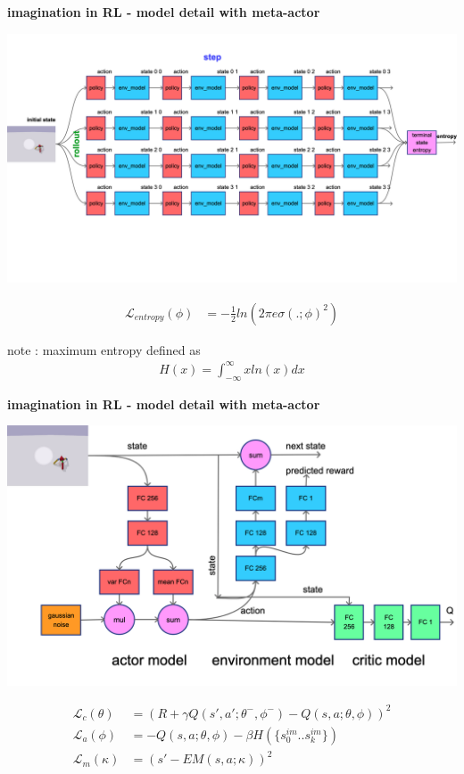 \documentclass[xcolor=dvipsnames]{beamer}
\begin{document}
\begin{frame}{\bf imagination in RL - model detail with meta-actor}

  {\centering \includegraphics[scale=0.08]{../diagrams/imaginationentropy.png}}

  \begin{align*}
    \mathcal{L}_{entropy}(\phi) &= -\frac{1}{2} ln(2\pi e \sigma(.;\phi)^2)
  \end{align*}


  note : maximum entropy defined as
    \begin{align*}
      H(x) = \int_{-\infty}^{\infty} x ln(x)dx
    \end{align*}
\end{frame}



\begin{frame}{\bf imagination in RL - model detail with meta-actor}

  {\centering \includegraphics[scale=0.1]{../diagrams/imaginationmodeldetail.png}}

  
    \begin{align*}
      \mathcal{L}_c(\theta) &= \left( R + \gamma Q(s', a'; \theta^-, \phi^- ) - Q(s, a; \theta, \phi )  \right)^2 \\
      \mathcal{L}_a(\phi) &= -Q(s, a; \theta, \phi) - \beta H(\{s^{im}_0 .. s^{im}_k\}) \\
      \mathcal{L}_m(\kappa) &= \left( s' - EM(s, a; \kappa)  \right)^2 \\    
    \end{align*}
\end{frame}
\end{document}
